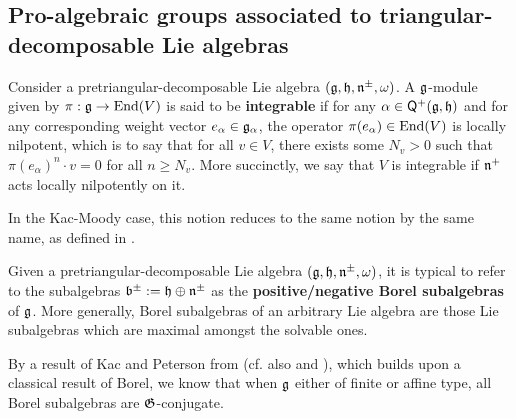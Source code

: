     \subsection{Pro-algebraic groups associated to triangular-decomposable Lie algebras}
        \begin{definition} \label{def: integrable_modules_over_triangular_decomposable_lie_algebras}
            Consider a pretriangular-decomposable Lie algebra $(\mathfrak{g}, \mathfrak{h}, \mathfrak{n}^{\pm}, \omega)$. A $\mathfrak{g}$-module given by $\pi: \mathfrak{g} \to \operatorname{End}(V)$ is said to be \textbf{integrable} if for any $\alpha \in \mathsf{Q}^+(\mathfrak{g}, \mathfrak{h})$ and for any corresponding weight vector $e_{\alpha} \in \mathfrak{g}_{\alpha}$, the operator $\pi(e_{\alpha}) \in \operatorname{End}(V)$ is locally nilpotent, which is to say that for all $v \in V$, there exists some $N_v > 0$ such that $\pi(e_{\alpha})^n \cdot v = 0$ for all $n \geq N_v$. More succinctly, we say that $V$ is integrable if $\mathfrak{n}^+$ acts locally nilpotently on it.
        \end{definition}
        In the Kac-Moody case, this notion reduces to the same notion by the same name, as defined in \cite[Chapter 3]{kac_infinite_dimensional_lie_algebras}.

        Given a pretriangular-decomposable Lie algebra $(\mathfrak{g}, \mathfrak{h}, \mathfrak{n}^{\pm}, \omega)$, it is typical to refer to the subalgebras $\mathfrak{b}^{\pm} := \mathfrak{h} \oplus \mathfrak{n}^{\pm}$ as the \textbf{positive/negative Borel subalgebras} of $\mathfrak{g}$. More generally, Borel subalgebras of an arbitrary Lie algebra are those Lie subalgebras which are maximal amongst the solvable ones.

        \begin{example} \label{example: kac_moody_groups}
            
        \end{example}
        \begin{remark}
            By a result of Kac and Peterson from \cite{kac_peterson_infinite_flag_varieties_and_conjugacy_of_cartan_subalgebras} (cf. also \cite{chernousov_egorov_gille_pianzola_cohomological_proof_of_peterson_kac_theorem} and \cite{chernousov_neher_pianzola_conjugacy_of_cartan_subalgebras_in_EALAs_with_non_fgc_centreless_cores}), which builds upon a classical result of Borel, we know that when $\mathfrak{g}$ either of finite or affine type, all Borel subalgebras are $\mathfrak{G}$-conjugate.
        \end{remark}